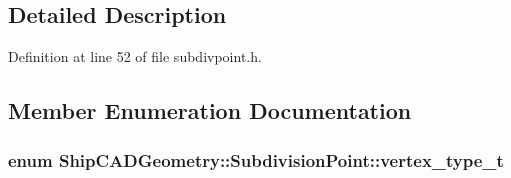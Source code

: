 \subsection{Detailed Description}


Definition at line 52 of file subdivpoint.\-h.



\subsection{Member Enumeration Documentation}
\hypertarget{classShipCADGeometry_1_1SubdivisionPoint_a03df9289cd8543cd3a567fa6c8e44c43}{
\subsubsection[{vertex\-\_\-type\-\_\-t}]{\setlength{\rightskip}{0pt plus 5cm}enum {\bf Ship\-C\-A\-D\-Geometry\-::\-Subdivision\-Point\-::vertex\-\_\-type\-\_\-t}}}\label{classShipCADGeometry_1_1SubdivisionPoint_a03df9289cd8543cd3a567fa6c8e44c43}
